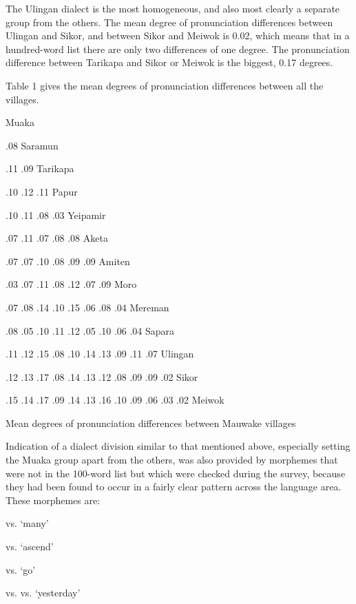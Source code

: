 The Ulingan dialect is the most homogeneous, and also most clearly a separate group from the others. The mean degree of pronunciation differences between Ulingan and Sikor, and between Sikor and Meiwok is 0.02, which means that in a hundred-word list there are only two differences of one degree.  The pronunciation difference between Tarikapa and Sikor or Meiwok is the biggest, 0.17 degrees.



Table 1 gives the mean degrees of pronunciation differences between all the villages.

Muaka

.08  Saramun

.11  .09  Tarikapa

.10  .12  .11  Papur

.10  .11  .08  .03  Yeipamir

.07  .11  .07  .08  .08  Aketa

.07  .07  .10  .08  .09  .09  Amiten

.03  .07  .11  .08  .12  .07  .09  Moro

.07  .08  .14  .10  .15  .06  .08  .04  Mereman

.08  .05  .10  .11  .12  .05  .10  .06  .04  Sapara

.11  .12  .15  .08  .10  .14  .13  .09  .11  .07  Ulingan

.12  .13  .17  .08  .14  .13  .12  .08  .09  .09  .02  Sikor

.15  .14  .17  .09  .14  .13  .16  .10  .09  .06  .03  .02  Meiwok


\begin{table}
\caption{Mean degrees of pronunciation differences between Mauwake villages}
\label{tab:1}
\end{table}

Indication of a dialect division similar to that mentioned above, especially setting the Muaka group apart from the others, was also provided by morphemes that were not in the 100-word list but which were checked during the survey, because they had been found to occur in a fairly clear pattern across the language area. These morphemes are:

    vs.        `many'

  vs.        `ascend'

    vs.        `go'

    vs.      vs.    `yesterday'


